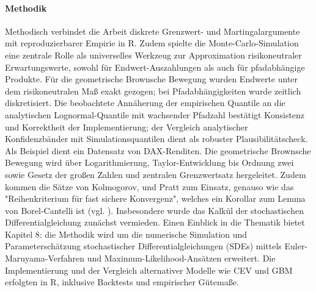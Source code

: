 \paragraph{Methodik}
Methodisch verbindet die Arbeit diskrete Grenzwert- und Martingalargumente mit 
reproduzierbarer Empirie in R. Zudem spielte die Monte-Carlo-Simulation eine zentrale Rolle als universelles Werkzeug zur Approximation risikoneutraler Erwartungswerte, sowohl für Endwert-Auszahlungen als auch für pfadabhängige Produkte. Für die geometrische Brownsche Bewegung wurden Endwerte unter dem risikoneutralen Maß exakt gezogen; bei Pfadabhängigkeiten wurde zeitlich diskretisiert. Die beobachtete Annäherung der empirischen Quantile an die analytischen Lognormal-Quantile mit wachsender Pfadzahl bestätigt Konsistenz und Korrektheit der Implementierung; der Vergleich analytischer Konfidenzbänder mit Simulationsquantilen dient als robuster Plausibilitätscheck.
Als Beispiel dient ein Datensatz von DAX-Renditen.
Die geometrische Brownsche Bewegung wird über Logarithmierung, Taylor-Entwicklung bis Ordnung zwei sowie Gesetz der großen Zahlen und 
zentralen Grenzwertsatz hergeleitet. Zudem kommen die Sätze von Kolmogorov, und Pratt zum Einsatz, 
genauso wie das "Reihenkriterium für fast sichere Konvergenz", welches 
ein Korollar zum Lemma von Borel-Cantelli ist (vgl. \cite{henze}). Insbesondere wurde
das Kalkül der stochastischen Differentialgleichung zunächst vermieden. Einen Einblick
in die Thematik bietet Kapitel 8: die Methodik wird um die numerische Simulation und Parameterschätzung stochastischer Differentialgleichungen (SDEs) mittels Euler-Maruyama-Verfahren und Maximum-Likelihood-Ansätzen erweitert. 
Die Implementierung und der Vergleich alternativer Modelle wie CEV und GBM erfolgten in R, inklusive Backtests und empirischer Gütemaße.
